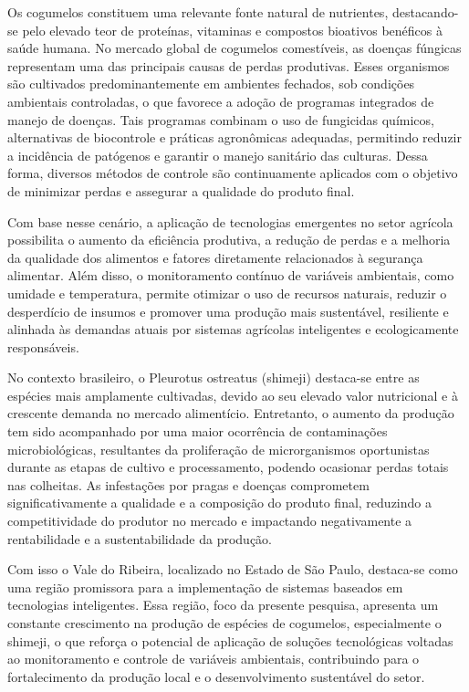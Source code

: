 Os cogumelos constituem uma relevante fonte natural de nutrientes, destacando-se pelo elevado teor de proteínas, vitaminas e compostos bioativos benéficos à saúde humana. No mercado global de cogumelos comestíveis, as doenças fúngicas representam uma das principais causas de perdas produtivas. Esses organismos são cultivados predominantemente em ambientes fechados, sob condições ambientais controladas, o que favorece a adoção de programas integrados de manejo de doenças. Tais programas combinam o uso de fungicidas químicos, alternativas de biocontrole e práticas agronômicas adequadas, permitindo reduzir a incidência de patógenos e garantir o manejo sanitário das culturas. Dessa forma, diversos métodos de controle são continuamente aplicados com o objetivo de minimizar perdas e assegurar a qualidade do produto final.\cite{Bellettini2017}

Com base nesse cenário, a aplicação de tecnologias emergentes no setor agrícola possibilita o aumento da eficiência produtiva, a redução de perdas e a melhoria da qualidade dos alimentos e fatores diretamente relacionados à segurança alimentar. Além disso, o monitoramento contínuo de variáveis ambientais, como umidade e temperatura, permite otimizar o uso de recursos naturais, reduzir o desperdício de insumos e promover uma produção mais sustentável, resiliente e alinhada às demandas atuais por sistemas agrícolas inteligentes e ecologicamente responsáveis.

No contexto brasileiro, o Pleurotus ostreatus (shimeji) destaca-se entre as espécies mais amplamente cultivadas, devido ao seu elevado valor nutricional e à crescente demanda no mercado alimentício. Entretanto, o aumento da produção tem sido acompanhado por uma maior ocorrência de contaminações microbiológicas, resultantes da proliferação de microrganismos oportunistas durante as etapas de cultivo e processamento, podendo ocasionar perdas totais nas colheitas. As infestações por pragas e doenças comprometem significativamente a qualidade e a composição do produto final, reduzindo a competitividade do produtor no mercado e impactando negativamente a rentabilidade e a sustentabilidade da produção.\cite{Scheffer2023}

Com isso o Vale do Ribeira, localizado no Estado de São Paulo, destaca-se como uma região promissora para a implementação de sistemas baseados em tecnologias inteligentes. Essa região, foco da presente pesquisa, apresenta um constante crescimento na produção de espécies de cogumelos, especialmente o shimeji, o que reforça o potencial de aplicação de soluções tecnológicas voltadas ao monitoramento e controle de variáveis ambientais, contribuindo para o fortalecimento da produção local e o desenvolvimento sustentável do setor.\cite{Urben2017}

